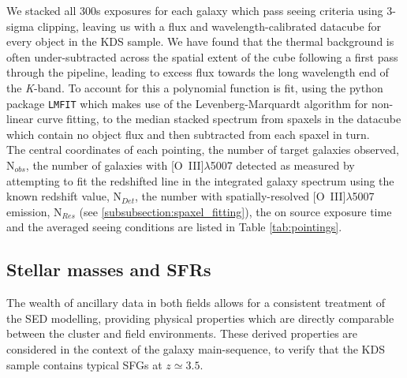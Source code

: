 \documentclass[fleqn,usenatbib]{mn2e}
\begin{document}
We stacked all 300s exposures for each galaxy which pass seeing criteria using 3-sigma clipping, leaving us with a flux and wavelength-calibrated datacube for every object in the KDS sample.
We have found that the thermal background is often under-subtracted across the spatial extent of the cube following a first pass through the pipeline, leading to excess flux towards the long wavelength end of the {\it K}-band.
To account for this a polynomial function is fit, using the python package {\tt LMFIT} \citep{Newville2014} which makes use of the Levenberg-Marquardt algorithm for non-linear curve fitting, to the median stacked spectrum from spaxels in the datacube which contain no object flux and then subtracted from each spaxel in turn. \\

The central coordinates of each pointing, the number of target galaxies observed, N$_{obs}$, the number of galaxies with [O~{\sc III}]$\lambda$5007 detected as measured by attempting to fit the redshifted line in the integrated galaxy spectrum using the known redshift value, N$_{Det}$, the number with spatially-resolved [O~{\sc III}]$\lambda$5007 emission, N$_{Res}$ (see \cref{subsubsection:spaxel_fitting}), the on source exposure time and the averaged seeing conditions are listed in Table \ref{tab:pointings}.

\subsection{Stellar masses and SFRs}\label{subsec:stellar_masses_and_sfrs}
The wealth of ancillary data in both fields allows for a consistent treatment of the SED modelling, providing physical properties which are directly comparable between the cluster and field environments.
These derived properties are considered in the context of the galaxy main-sequence, to verify that the KDS sample contains typical SFGs at $z\simeq3.5$.   
\end{document}
